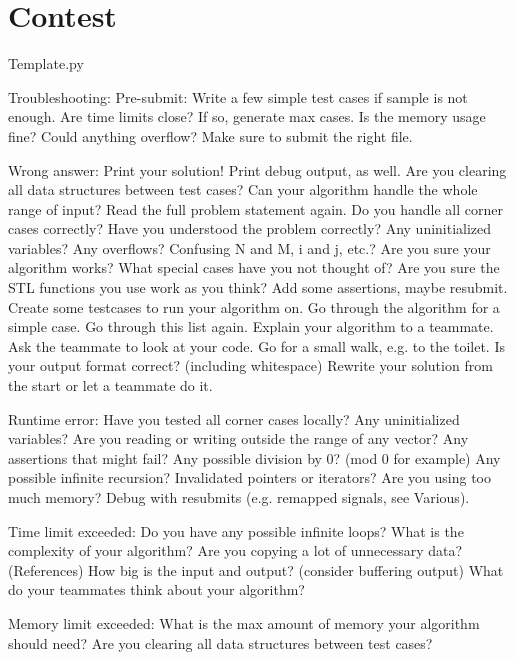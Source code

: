 \chapter{Contest}
Template.py

Troubleshooting:
Pre-submit:
Write a few simple test cases if sample is not enough.
Are time limits close? If so, generate max cases.
Is the memory usage fine?
Could anything overflow?
Make sure to submit the right file.

Wrong answer:
Print your solution! Print debug output, as well.
Are you clearing all data structures between test cases?
Can your algorithm handle the whole range of input?
Read the full problem statement again.
Do you handle all corner cases correctly?
Have you understood the problem correctly?
Any uninitialized variables?
Any overflows?
Confusing N and M, i and j, etc.?
Are you sure your algorithm works?
What special cases have you not thought of?
Are you sure the STL functions you use work as you think?
Add some assertions, maybe resubmit.
Create some testcases to run your algorithm on.
Go through the algorithm for a simple case.
Go through this list again.
Explain your algorithm to a teammate.
Ask the teammate to look at your code.
Go for a small walk, e.g. to the toilet.
Is your output format correct? (including whitespace)
Rewrite your solution from the start or let a teammate do it.

Runtime error:
Have you tested all corner cases locally?
Any uninitialized variables?
Are you reading or writing outside the range of any vector?
Any assertions that might fail?
Any possible division by 0? (mod 0 for example)
Any possible infinite recursion?
Invalidated pointers or iterators?
Are you using too much memory?
Debug with resubmits (e.g. remapped signals, see Various).

Time limit exceeded:
Do you have any possible infinite loops?
What is the complexity of your algorithm?
Are you copying a lot of unnecessary data? (References)
How big is the input and output? (consider buffering output)
What do your teammates think about your algorithm?

Memory limit exceeded:
What is the max amount of memory your algorithm should need?
Are you clearing all data structures between test cases?
%